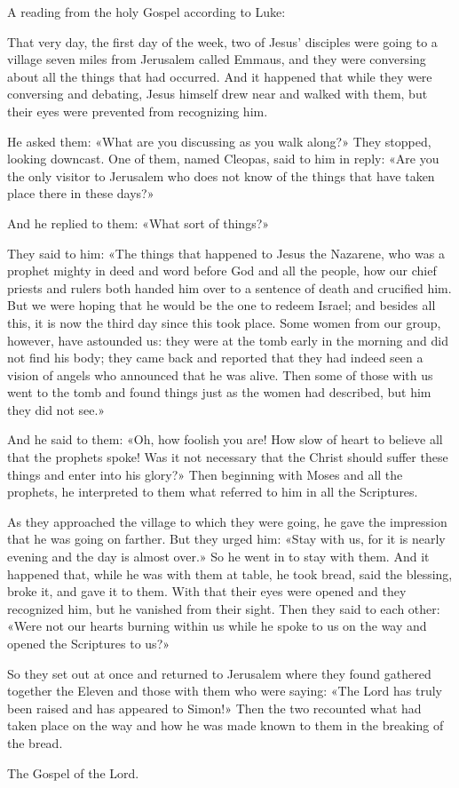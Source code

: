 \indent{} A reading from the holy Gospel according to Luke:

That very day, the first day of the week, two of Jesus’ disciples were going to a village seven miles from Jerusalem called Emmaus, and they were conversing about all the things that had occurred. And it happened that while they were conversing and debating, Jesus himself drew near and walked with them, but their eyes were prevented from recognizing him.

He asked them: «What are you discussing as you walk along?» They stopped, looking downcast. One of them, named Cleopas, said to him in reply: «Are you the only visitor to Jerusalem who does not know of the things that have taken place there in these days?»

And he replied to them: «What sort of things?»

They said to him: «The things that happened to Jesus the Nazarene, who was a prophet mighty in deed and word before God and all the people, how our chief priests and rulers both handed him over to a sentence of death and crucified him. But we were hoping that he would be the one to redeem Israel; and besides all this, it is now the third day since this took place. Some women from our group, however, have astounded us: they were at the tomb early in the morning and did not find his body; they came back and reported that they had indeed seen a vision of angels who announced that he was alive. Then some of those with us went to the tomb and found things just as the women had described, but him they did not see.»

And he said to them: «Oh, how foolish you are! How slow of heart to believe all that the prophets spoke! Was it not necessary that the Christ should suffer these things and enter into his glory?» Then beginning with Moses and all the prophets, he interpreted to them what referred to him in all the Scriptures.

As they approached the village to which they were going, he gave the impression that he was going on farther. But they urged him: «Stay with us, for it is nearly evening and the day is almost over.» So he went in to stay with them. And it happened that, while he was with them at table, he took bread, said the blessing, broke it, and gave it to them. With that their eyes were opened and they recognized him, but he vanished from their sight. Then they said to each other: «Were not our hearts burning within us while he spoke to us on the way and opened the Scriptures to us?»

So they set out at once and returned to Jerusalem where they found gathered together the Eleven and those with them who were saying: «The Lord has truly been raised and has appeared to Simon!» Then the two recounted what had taken place on the way and how he was made known to them in the breaking of the bread.

The Gospel of the Lord.